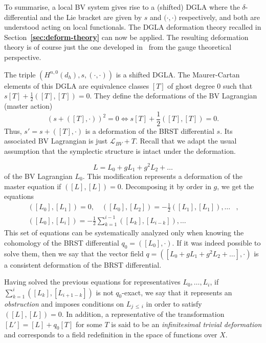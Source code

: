 \documentclass[a4paper,12pt]{article}
\numberwithin{equation}{section} %
\newcommand{\bref}[1]{\textbf{\ref{#1}}}
\renewcommand{\leq}{\,{\leqslant}\,}
\newcommand{\ab}[2]{\big(#1,#2\big)}
\def\cL{\mathcal{L}}
\begin{document}
To summarise, a local BV system gives rise to a (shifted) DGLA where the $\delta$-differential and the Lie bracket are given by $s$ and $\ab{\cdot}{\cdot}$ respectively, and both are understood acting on local functionals. The DGLA deformation theory recalled in Section~\bref{sec:deform-theory}  can now be applied. The resulting deformation theory is of course just the one developed in~\cite{Barnich:1993vg,Barnich:1993pa} from the gauge theoretical perspective.


The triple $(H^{n,0}(d_h),s,(\cdot,\cdot))$ is a shifted DGLA.  The Maurer-Cartan elements of this DGLA are equivalence classes $[T]$ of ghost degree $0$ such that $s[T] + \frac{1}{2}([T],[T]) = 0$. They define the deformations of the BV Lagrangian (master action) 
\begin{equation}
	(s+([T],\cdot))^2 = 0 \Leftrightarrow s[T] + \frac{1}{2}([T],[T]) = 0.
\end{equation}
Thus, $s' = s+([T],\cdot)$ is a deformation of the BRST differential $s$. Its associated BV Lagrangian is just $\cL_{BV}+T$. Recall that we adapt the usual assumption  that the symplectic structure is intact under the deformation.  

\iffalse
\begin{equation}
	L = L_0 + gL_1 + g^2L_2 + \dots
\end{equation}
of the BV Lagrangian $L_0$. This modification represents a deformation of the master equation if $([L],[L])=0$. Decomposing it by order in $g$, we get the equations
\begin{align}
	([L_0],[L_1]) = 0, \quad ([L_0],[L_2]) = -\frac{1}{2}([L_1],[L_1]), \dots&,\\
    ([L_0],[L_i]) = -\frac{1}{2}\sum_{k=1}^{i-1}([L_k],[L_{i-k}]), \dots&
\end{align}
This set of equations can be systematically analyzed only when knowing the cohomology of the BRST differential $q_0 = ([L_0],\cdot)$. If it was indeed possible to solve them, then we say that the vector field $q = ([L_0 + gL_1 + g^2L_2 + \dots],\cdot)$ is a consistent deformation of the BRST differential.

Having solved the previous equations for representatives $L_0,\dots,L_{i}$, if $\sum_{k=1}^{i}([L_k],[L_{i+1-k}])$ is not $q_0$-exact, we say that it represents an \textit{obstruction} and imposes conditions on $L_{j\leq i}$ in order to satisfy $([L],[L])=0$. In addition, a representative of the transformation $[L'] = [L] + q_0 [T]$ for some $T$ is said to be an \textit{infinitesimal trivial deformation} and corresponds to a field redefinition in the space of functions over $X$.
\end{document}
